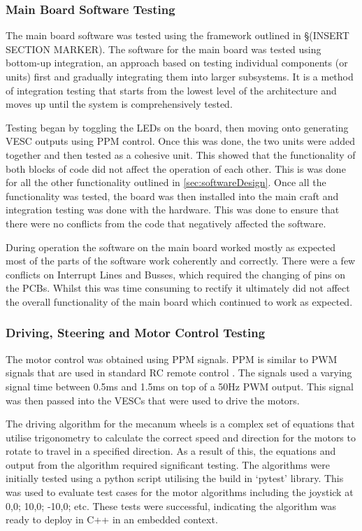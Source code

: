\documentclass [12pt]{article}
\begin{document}
\subsubsection{Main Board Software Testing}
The main board software was tested using the framework outlined in §(INSERT SECTION MARKER). The software for the main board was tested using bottom-up integration, an approach based on testing individual components (or units) first and gradually integrating them into larger subsystems. It is a method of integration testing that starts from the lowest level of the architecture and moves up until the system is comprehensively tested. 

Testing began by toggling the LEDs on the board, then moving onto generating VESC outputs using PPM control. Once this was done, the two units were added together and then tested as a cohesive unit. This showed that the functionality of both blocks of code did not affect the operation of each other. This is was done for all the other functionality outlined in \ref{sec:softwareDesign}. Once all the functionality was tested, the board was then installed into the main craft and integration testing was done with the hardware. This was done to ensure that there were no conflicts from the code that negatively affected the software. 

During operation the software on the main board worked mostly as expected most of the parts of the software work coherently and correctly. There were a few conflicts on Interrupt Lines and Busses, which required the changing of pins on the PCBs. Whilst this was time consuming to rectify it ultimately did not affect the overall functionality of the main board which continued to work as expected. 

\subsubsection{Driving, Steering and Motor Control Testing}
The motor control was obtained using PPM signals. PPM is similar to PWM signals that are used in standard RC remote control \cite{ppm}. The signals used a varying signal time between 0.5ms and 1.5ms on top of a 50Hz PWM output. This signal was then passed into the VESCs that were used to drive the motors. 

The driving algorithm for the mecanum wheels is a complex set of equations that utilise trigonometry to calculate the correct speed and direction for the motors to rotate to travel in a specified direction. As a result of this, the equations and output from the algorithm required significant testing. The algorithms were initially tested using a python script utilising the build in ‘pytest’ library. This was used to evaluate test cases for the motor algorithms including the joystick at 0,0; 10,0; -10,0; etc. These tests were successful, indicating the algorithm was ready to deploy in C++ in an embedded context. 
\end{document}
